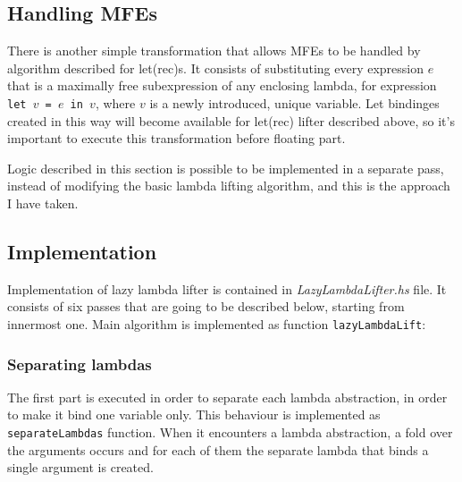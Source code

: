 \documentclass[12pt,a4paper]{report}
\begin{document}
\subsection{Handling MFEs}
There is another simple transformation that allows MFEs to be handled by
algorithm described for let(rec)s. It consists of substituting every expression
$e$ that is a maximally free subexpression of any enclosing lambda, for
expression \texttt{let $v$ = $e$ in $v$}, where $v$ is a newly introduced,
unique variable. Let bindinges created in this way will become available for
let(rec) lifter described above, so it's important to execute this
transformation before floating part.

Logic described in this section is possible to be implemented in a separate
pass, instead of modifying the basic lambda lifting algorithm, and this is the
approach I have taken.

\subsection{Implementation}
Implementation of lazy lambda lifter is contained in
\textit{LazyLambdaLifter.hs} file. It consists of six passes that are going to
be described below, starting from innermost one. Main algorithm is implemented
as function \texttt{lazyLambdaLift}:

\vspace*{0.2in}

\subsubsection{Separating lambdas}
The first part is executed in order to separate each lambda abstraction, in
order to make it bind one variable only. This behaviour is implemented as
\texttt{separateLambdas} function. When it encounters a lambda abstraction, a
fold over the arguments occurs and for each of them the separate lambda that
binds a single argument is created.
\end{document}
